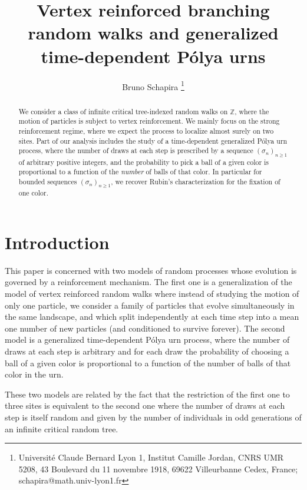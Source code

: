 \documentclass[11pt]{article}
\title{Vertex reinforced branching random walks and generalized time-dependent P\'olya urns}
\author{Bruno Schapira
\footnote{Universit\'e Claude Bernard Lyon 1, Institut Camille Jordan, CNRS UMR 5208, 43 Boulevard du 11 novembre 1918, 69622 Villeurbanne Cedex, France;  schapira@math.univ-lyon1.fr}}
\newcommand{\1}{{\text{\Large $\mathfrak 1$}}}
\begin{document}
\maketitle

\begin{abstract} We consider a class of infinite critical tree-indexed random walks on $\mathbb Z$, where the motion of particles is subject to vertex reinforcement. We mainly focus on the strong reinforcement regime, where we expect the process to localize almost surely on two sites. Part of our analysis includes the study of a time-dependent generalized P\'olya urn process, where the number of draws at each step is prescribed by a sequence $(\sigma_n)_{n\ge 1}$ of arbitrary positive integers, and the probability to pick a ball of a given color is proportional to a function of the {\it number} of balls of that color. In particular for bounded sequences $(\sigma_n)_{n\ge 1}$, we recover Rubin's characterization for the fixation of one color.   
\end{abstract}


\section{Introduction} 
This paper is concerned with two models of random processes whose evolution is governed by a reinforcement mechanism. The first one is a generalization of the model of vertex reinforced random walks where instead of studying the motion of only one particle, we consider a family of particles that evolve simultaneously in the same landscape, and which split independently at each time step into a mean one number of new particles (and conditioned to survive forever). The second model is a generalized time-dependent P\'olya urn process, where the number of draws at each step is arbitrary and for each  draw the probability of choosing a ball of a given color is proportional to a function of the number of balls of that color in the urn.  


These two models are related by the fact that the restriction of the first one to three sites is equivalent to the second one where the number of draws at each step is itself random and given by the number of individuals in odd generations of an infinite critical random tree. 
\end{document}
